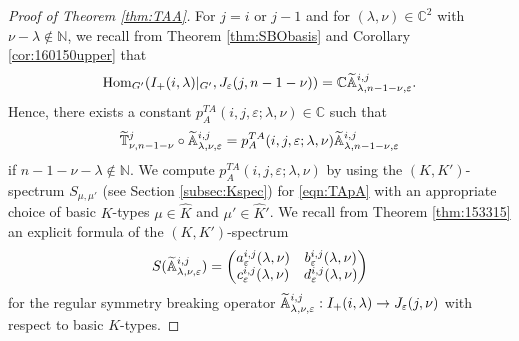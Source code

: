 \begin{proof}
[Proof of Theorem \ref{thm:TAA}]
For $j=i$ or $j-1$
 and for $(\lambda, \nu)\in {\mathbb{C}}^2$
 with $\nu-\lambda \not\in {\mathbb{N}}$,
 we recall from Theorem \ref{thm:SBObasis}
 and Corollary \ref{cor:160150upper}
 that 
\[
  \operatorname{Hom}_{G'}(I_+(i,\lambda)|_{G'}, J_{\varepsilon}(j,n-1-\nu))
  =
  {\mathbb{C}} {\widetilde{\mathbb{A}}}_{{\lambda},{n-1-\nu},{\varepsilon}}^{{i,j}}.  
\]
Hence, 
 there exists a constant
$p_A ^{TA}(i,j,\varepsilon;\lambda, \nu) \in {\mathbb{C}}$
 such that
\begin{equation}
\label{eqn:TApA}
  \widetilde{{\mathbb{T}}}_{{\nu},{n-1-\nu}}^{{j}}
  \circ
  {\widetilde{\mathbb{A}}}_{{\lambda},{\nu},{\varepsilon}}^{{i,j}}
  =
  p_A ^{TA}(i,j,\varepsilon;\lambda, \nu)
  {\widetilde{\mathbb{A}}}_{{\lambda},{n-1-\nu},{\varepsilon}}^{{i,j}}
\end{equation}
 if $n-1-\nu-\lambda \not\in {\mathbb{N}}$.  
We compute $p_A ^{TA}(i,j,\varepsilon;\lambda, \nu)$
 by using the $(K,K')$-spectrum $S_{\mu,\mu'}$
 (see Section \ref{subsec:Kspec})
 for \eqref{eqn:TApA}
 with an appropriate choice of basic $K$-types $\mu \in \widehat K$ and $\mu' \in \widehat K'$.  
We recall from Theorem \ref{thm:153315}
 an explicit formula
 of the $(K,K')$-spectrum
\[
S({\widetilde{\mathbb{A}}}_{{\lambda},{\nu},{\varepsilon}}^{{i,j}})
=
\begin{pmatrix}
a_{\varepsilon}^{i,j}(\lambda,\nu)
&
b_{\varepsilon}^{i,j}(\lambda,\nu)
\\
c_{\varepsilon}^{i,j}(\lambda,\nu)
&
d_{\varepsilon}^{i,j}(\lambda,\nu)
\end{pmatrix}
\]
for the regular symmetry breaking operator
${\widetilde{\mathbb{A}}}_{{\lambda},{\nu},{\varepsilon}}^{{i,j}}:
I_+(i,\lambda) \to J_{\varepsilon}(j,\nu)$
 with respect to basic $K$-types.  


\end{proof}

